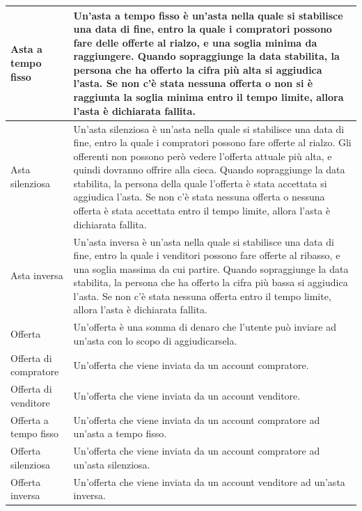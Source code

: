 \begin{longtable}{|C{3.5cm}|L{11.2cm}|}
            \hline
                Asta a tempo fisso &
                Un'asta a tempo fisso è un'asta nella quale si stabilisce una data di fine, entro la quale i compratori possono fare delle offerte al rialzo, e una soglia minima da raggiungere. Quando sopraggiunge la data stabilita, la persona che ha offerto la cifra più alta si aggiudica l'asta. Se non c'è stata nessuna offerta o non si è raggiunta la soglia minima entro il tempo limite, allora l'asta è dichiarata fallita.\\
            \hline
                Asta silenziosa &
                Un'asta silenziosa è un'asta nella quale si stabilisce una data di fine, entro la quale i compratori possono fare offerte al rialzo. Gli offerenti non possono però vedere l'offerta attuale più alta, e quindi dovranno offrire alla cieca. Quando sopraggiunge la data stabilita, la persona della quale l'offerta è stata accettata si aggiudica l'asta. Se non c'è stata nessuna offerta o nessuna offerta è stata accettata entro il tempo limite, allora l'asta è dichiarata fallita.\\
            \hline
                Asta inversa &
                Un'asta inversa è un'asta nella quale si stabilisce una data di fine, entro la quale i venditori possono fare offerte al ribasso, e una soglia massima da cui partire. Quando sopraggiunge la data stabilita, la persona che ha offerto la cifra più bassa si aggiudica l'asta. Se non c'è stata nessuna offerta entro il tempo limite, allora l'asta è dichiarata fallita.\\
            \hline
                Offerta &
                Un'offerta è una somma di denaro che l'utente può inviare ad un'asta con lo scopo di aggiudicarsela.\\
            \hline
                Offerta di compratore &
                Un'offerta che viene inviata da un account compratore.\\
            \hline
                Offerta di venditore &
                Un'offerta che viene inviata da un account venditore.\\
            \hline
                 Offerta a tempo fisso &
                Un'offerta che viene inviata da un account compratore ad un'asta a tempo fisso.\\
            \hline
                Offerta silenziosa &
                Un'offerta che viene inviata da un account compratore ad un'asta silenziosa.\\
            \hline
                Offerta inversa &
                Un'offerta che viene inviata da un account venditore ad un'asta inversa.\\
            \hline
        \end{longtable}
        
